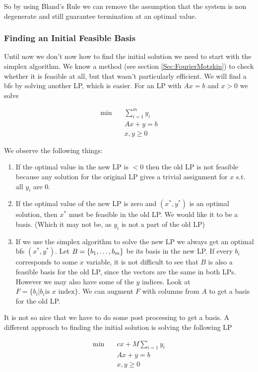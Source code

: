 So by using Bland's Rule we can remove the assumption that the system is non degenerate and still guarantee termination at an optimal value.

\subsubsection*{Finding an Initial Feasible Basis}

Until now we don't now how to find the initial solution we need to start with the simplex algorithm. We know a method (see section \ref{Sec:FourierMotzkin}) to check whether it is feasible at all, but that wasn't particularly efficient. We will find a bfs by solving another LP, which is easier. For an LP with $Ax=b$ and $x>0$ we solve

\begin{align*}
\min \quad & \sum_{i=1}^m y_i\\
&Ax+y=b\\
&x,y\geq 0
\end{align*}

We observe the following things:

\begin{enumerate}
\item If the optimal value in the new LP is $<0$ then the old LP is not feasible because any solution for the original LP gives a trivial assignment for $x$ s.t. all $y_i$ are 0.
\item If the optimal value of the new LP is zero and $(x^*, y^*)$ is an optimal solution, then $x^*$ must be feasible in the old LP. We would like it to be a basis. (Which it may not be, as $y_i$ is not a part of the old LP)
\item If we use the simplex algorithm to solve the new LP we always get an optimal bfs $(x^*,y^*)$. Let $B=\{{b}_1,\ldots,{b}_{m}\}$ be its basis in the new LP. If every $b_i$ corresponds to some $x$ variable, it is not difficult to see that $B$ is also a feasible basis for the old LP, since the vectors are the same in both LPs. However we may also have some of the $y$ indices. Look at $F=\{b_i | b_i \text{is $x$ index}\}$. We can augment $F$ with columns from $A$ to get a basis for the old LP.
\end{enumerate}

It is not so nice that we have to do some post processing to get a basis. A different approach to finding the initial solution is solving the following LP

\begin{align*}
\min \quad & cx + M\sum_{i=1} y_i\\
&Ax+y=b\\
&x,y\geq 0
\end{align*}

